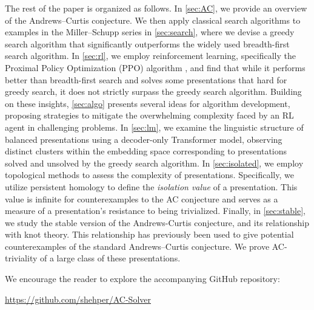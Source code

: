 \medskip The rest of the paper is organized as follows. In \cref{sec:AC}, we provide an overview of the Andrews--Curtis conjecture. We then apply classical search algorithms to examples in the Miller--Schupp series in \cref{sec:search}, where we devise a greedy search algorithm that significantly outperforms the widely used breadth-first search algorithm. In \cref{sec:rl}, we employ reinforcement learning, specifically the Proximal Policy Optimization (PPO) algorithm \cite{schulman2017proximal}, and find that while it performs better than breadth-first search and solves some presentations that hard for greedy search, it does not strictly surpass the greedy search algorithm.
Building on these insights, \cref{sec:algo} presents several ideas for algorithm development, proposing strategies to mitigate the overwhelming complexity faced by an RL agent in challenging problems.
In \cref{sec:lm}, we examine the linguistic structure of balanced presentations using a decoder-only Transformer model, observing distinct clusters within the embedding space corresponding to presentations solved and unsolved by the greedy search algorithm.
In \cref{sec:isolated}, we employ topological methods to assess the complexity of presentations. Specifically, we utilize persistent homology to define the \textit{isolation value} of a presentation. This value is infinite for counterexamples to the AC conjecture and serves as a measure of a presentation's resistance to being trivialized. Finally, in \cref{sec:stable}, we study the stable version of the Andrews-Curtis conjecture, and its relationship with knot theory.
This relationship has previously been used to give potential counterexamples of the standard Andrews--Curtis conjecture. We prove AC-triviality of a large class of these presentations. 

\medskip\noindent
We encourage the reader to explore the accompanying GitHub repository:
\begin{center}
	\href{https://github.com/shehper/AC-Solver}{https://github.com/shehper/AC-Solver}
\end{center}